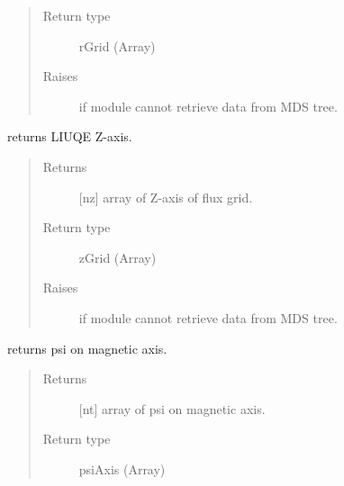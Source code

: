 \documentclass[letterpaper,10pt,english]{sphinxmanual}
\begin{document}
\begin{fulllineitems}
\begin{fulllineitems}
\begin{quote}
\begin{description}
\item[{Return type}] \leavevmode
rGrid (Array)

\item[{Raises}] \leavevmode
{} \textendash{} if module cannot retrieve data from MDS tree.

\end{description}\end{quote}

\end{fulllineitems}


\begin{fulllineitems}
\label{\detokenize{eqtools:eqtools.TCVLIUQE.TCVLIUQETree.getZGrid}}
returns LIUQE Z-axis.
\begin{quote}\begin{description}
\item[{Returns}] \leavevmode
{[}nz{]} array of Z-axis of flux grid.

\item[{Return type}] \leavevmode
zGrid (Array)

\item[{Raises}] \leavevmode
{} \textendash{} if module cannot retrieve data from MDS tree.

\end{description}\end{quote}

\end{fulllineitems}


\begin{fulllineitems}
\label{\detokenize{eqtools:eqtools.TCVLIUQE.TCVLIUQETree.getFluxAxis}}
returns psi on magnetic axis.
\begin{quote}\begin{description}
\item[{Returns}] \leavevmode
{[}nt{]} array of psi on magnetic axis.

\item[{Return type}] \leavevmode
psiAxis (Array)


\end{description}
\end{quote}
\end{fulllineitems}
\end{fulllineitems}
\end{document}
